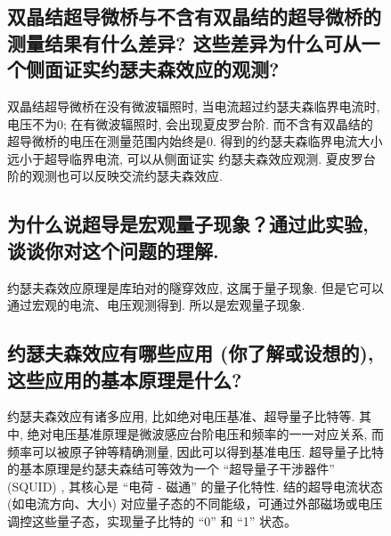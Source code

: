 \documentclass[font=default]{mpltx}
\begin{document}
\begin{figure}[h]
\subsection{双晶结超导微桥与不含有双晶结的超导微桥的测量结果有什么差异? 这些差异为什么可从一个侧面证实约瑟夫森效应的观测? }
双晶结超导微桥在没有微波辐照时, 当电流超过约瑟夫森临界电流时, 电压不为0; 在有微波辐照时, 会出现夏皮罗台阶. 而不含有双晶结的超导微桥的电压在测量范围内始终是0. 
得到的约瑟夫森临界电流大小远小于超导临界电流, 可以从侧面证实
约瑟夫森效应观测.
夏皮罗台阶的观测也可以反映交流约瑟夫森效应.


\subsection{为什么说超导是宏观量子现象？通过此实验, 谈谈你对这个问题的理解. }
约瑟夫森效应原理是库珀对的隧穿效应, 这属于量子现象. 但是它可以通过宏观的电流、电压观测得到. 所以是宏观量子现象.

\subsection{约瑟夫森效应有哪些应用 (你了解或设想的), 这些应用的基本原理是什么? }
约瑟夫森效应有诸多应用, 比如绝对电压基准、超导量子比特等. 其中, 绝对电压基准原理是微波感应台阶电压和频率的一一对应关系, 而频率可以被原子钟等精确测量, 因此可以得到基准电压.
超导量子比特的基本原理是约瑟夫森结可等效为一个 “超导量子干涉器件” (SQUID) , 其核心是 “电荷 - 磁通” 的量子化特性. 结的超导电流状态 (如电流方向、大小) 对应量子态的不同能级，可通过外部磁场或电压调控这些量子态，实现量子比特的 “0” 和 “1” 状态。








\end{figure}
\end{document}
